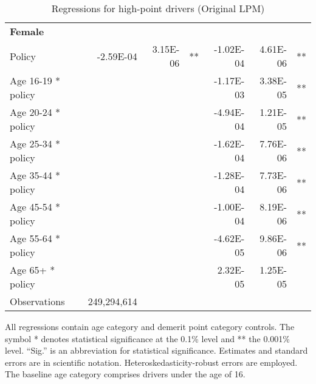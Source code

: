 \begin{table}
\begin{tabular}{l r r l r r l}
\hline 

\textbf{Female} \\ 

Policy             &  -2.59E-04        &  3.15E-06       &   **       &  -1.02E-04        &  4.61E-06       &   **       \\ 
Age 16-19 * policy           & & &  &  -1.17E-03        &  3.38E-05       &   **       \\ 
Age 20-24 * policy           & & &  &  -4.94E-04        &  1.21E-05       &   **       \\ 
Age 25-34 * policy           & & &  &  -1.62E-04        &  7.76E-06       &   **       \\ 
Age 35-44 * policy           & & &  &  -1.28E-04        &  7.73E-06       &   **       \\ 
Age 45-54 * policy           & & &  &  -1.00E-04        &  8.19E-06       &   **       \\ 
Age 55-64 * policy           & & &  &  -4.62E-05        &  9.86E-06       &   **       \\ 
Age 65+ * policy           & & &  &  2.32E-05        &  1.25E-05       &            \\ 
Observations & 249,294,614 \\ 


\hline 

\end{tabular} 
\caption{Regressions for high-point drivers (Original LPM)} 
All regressions contain age category and demerit point category controls. 
The symbol * denotes statistical significance at the 0.1\% level 
and ** the 0.001\% level. 
``Sig.'' is an abbreviation for statistical significance. 
Estimates and standard errors are in scientific notation. 
Heteroskedasticity-robust errors are employed. 
The baseline age category comprises drivers under the age of 16. 
\label{tab:orig_high_pt_regs} 
\end{table} 
 
